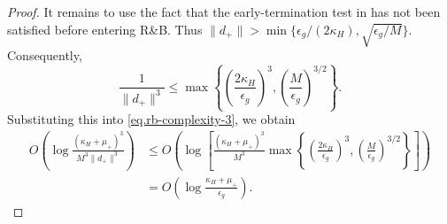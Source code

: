 \documentclass{article}
\begin{document}
\begin{proof}
    It remains to use the fact that the early-termination test in
     has not been satisfied before entering R\&B.
    Thus \(\|d_+\|>\min\{\epsilon_g/(2\kappa_H),
    \sqrt{\epsilon_g/M}\}\). Consequently,
    \[
        \frac{1}{\|d_+\|^3}
        \le
        \max\left\{
        \left(\frac{2\kappa_H}{\epsilon_g}\right)^3,
        \left(\frac{M}{\epsilon_g}\right)^{3/2}
        \right\}.
    \]
    Substituting this into \eqref{eq.rb-complexity-3}, we obtain
    \begin{align*}
        O\left(
        \log
        \frac{
                (\kappa_H+\mu_+)^3
            }{
                M^3\|d_+\|^3
            }
        \right)
         & \le
        O\left(
        \log
        \left[
            \frac{(\kappa_H+\mu_+)^3}{M^3}
            \max\left\{
            \left(\frac{2\kappa_H}{\epsilon_g}\right)^3,
            \left(\frac{M}{\epsilon_g}\right)^{3/2}
            \right\}
            \right]
        \right) \\
         & =
        O\left(
        \log\frac{\kappa_H+\mu_+}{\epsilon_g}
        \right).
    \end{align*}
\end{proof}
\end{document}
